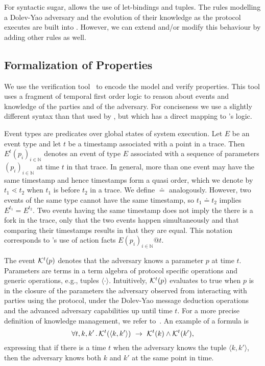 For syntactic sugar, \mTamarin{} allows the use of let-bindings and tuples. 
%
The rules modelling a Dolev-Yao adversary and the evolution of their knowledge as the protocol executes are built into \mTamarin.
%
However, we can extend and/or modify this behaviour by adding other rules as well.





\subsection{Formalization of Properties}
\label{sec:desired-properties}
We use the \mTamarin{} verification
tool~\cite{DBLP:conf/cav/MeierSCB13} to encode the model and verify properties.
%
This tool uses a fragment of temporal first order logic to reason about
events and knowledge of the parties and of the adversary.
%
For conciseness we use a slightly different syntax than
that used by \mTamarin{}, but which has a direct mapping to \mTamarin{}'s logic.
%

Event types are predicates over global states of system execution.
%
Let $E$ be an event type and let $t$ be a timestamp associated with a point in a
trace.
%
Then $E^{t}(p_i)_{i\in\mathbb{N}}$ denotes an event of type $E$ associated with
a sequence of parameters $(p_i)_{i\in\mathbb{N}}$ at time $t$ in that trace.
%
In general, more than one event may have the same timestamp and hence
timestamps form a quasi order, which we denote by $t_1 \lessdot t_2$ when $t_1$
is before $t_2$ in a trace.
%
We define $\doteq$ analogously.
%
However, two events of the same type cannot have the same timestamp, so
$t_1 \doteq t_2$ implies $E^{t_1} = E^{t_2}$.
%
Two events having the same timestamp does not imply the there is a fork in the
trace, only that the two events happen simultaneously and that comparing their
timestamps results in that they are equal.
%
This notation corresponds to \mTamarin{}'s use of action facts
$E(p_i)_{i\in\mathbb{N}}@t$.
%

The event $\mathcal{K}^t(p)$ denotes that the adversary knows a parameter $p$ at
time $t$.
%
Parameters are terms in a term algebra of protocol specific operations and
generic operations, e.g., tuples $\langle\cdot\rangle$.
%
Intuitively, $\mathcal{K}^t(p)$ evaluates to true when $p$ is in
the closure of the
parameters the adversary observed from interacting with parties using the
protocol, under the Dolev-Yao message deduction operations and
the advanced adversary capabilities up until time $t$.
%
For a more precise definition of knowledge management, we refer to~\cite{DBLP:conf/cav/MeierSCB13}.
%
An example of a formula is
\[
    \forall t, k, k'\mLogicDot \mK^{t}(\langle k, k'\rangle)\ \rightarrow\ 
\mK^{t}(k) \land \mK^{t}(k'),
\]
expressing that if there is a time $t$ when the adversary knows the tuple
$\langle k, k'\rangle$, then the adversary knows both
$k$ and $k'$ at the same point in time.
%

